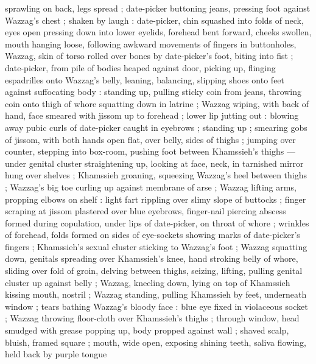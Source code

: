 sprawling on back, legs spread ; date-picker buttoning jeans, pressing foot against Wazzag's chest ;
shaken by laugh : date-picker, chin squashed into folds of neck, eyes open pressing down into lower
eyelids, forehead bent forward, cheeks swollen, mouth hanging %
loose, following awkward movements of fingers in buttonholes, Wazzag, skin of torso rolled over
bones by date-picker's foot, biting into fist ; date-picker, from pile of bodies heaped against
door, picking up, flinging espadrilles onto Wazzag's belly, leaning, balancing, slipping shoes onto
feet against suffocating body : standing up, pulling sticky coin from jeans, throwing coin onto
thigh of whore {\dashsemi} squatting down in latrine ; Wazzag wiping, with back of hand, face
smeared with jissom up to forehead ; lower lip jutting out : blowing away pubic curls of date-picker
caught in eyebrows ; standing up ; smearing gobs of jissom, with both hands open flat, over belly,
sides of thighs ; jumping over counter, stepping into box-room, pushing foot between Khamssieh's
thighs --- under genital cluster {\dashcom} straightening up, looking at face, neck, in tarnished
mirror hung over shelves ; Khamssieh groaning, squeezing Wazzag's heel between thighs ; Wazzag's big
toe curling up against membrane of arse ; Wazzag lifting arms, propping elbows on shelf : light fart
rippling over slimy slope of buttocks ; finger scraping at jissom plastered over blue eyebrows,
finger-nail piercing abscess formed during copulation, under lips of date-picker, on throat of whore
; wrinkles of forehead, folds formed on sides of eye-sockets showing marks of date-picker's fingers
; Khamssieh's sexual cluster sticking to Wazzag's foot ; Wazzag squatting down, genitals spreading
over Khamssieh's knee, hand stroking belly of whore, sliding over fold of groin, delving between
thighs, seizing, lifting, pulling genital cluster up against belly ; Wazzag, kneeling down, lying on
top of Khamssieh kissing mouth, nostril  ; Wazzag standing, pulling Khamssieh by feet, underneath window ;
tears bathing Wazzag's bloody face : blue eye fixed in violaceous socket ; Wazzag throwing
floor-cloth over Khamssieh's thighs ; through window, head smudged with grease popping up, body
propped against wall ; shaved scalp, bluish, framed %
square ; mouth, wide open, exposing shining teeth, saliva flowing, held back by purple tongue
